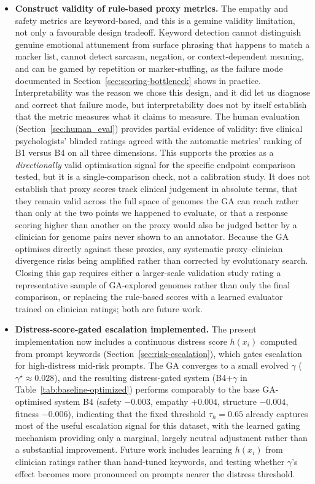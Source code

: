 \documentclass[mathematics,article,xetex,moreauthors]{Definitions/mdpi}
\begin{document}
\begin{itemize}
  \item \textbf{Construct validity of rule-based proxy metrics.} The
empathy and safety metrics are keyword-based, and this is a genuine
validity limitation, not only a favourable design tradeoff. Keyword
detection cannot distinguish genuine emotional attunement from surface
phrasing that happens to match a marker list, cannot detect sarcasm,
negation, or context-dependent meaning, and can be gamed by repetition
or marker-stuffing, as the failure mode documented in
Section~\ref{sec:scoring-bottleneck} shows in practice. Interpretability
was the reason we chose this design, and it did let us diagnose and
correct that failure mode, but interpretability does not by itself
establish that the metric measures what it claims to measure. The
human evaluation (Section~\ref{sec:human_eval}) provides partial
evidence of validity: five clinical psychologists' blinded ratings
agreed with the automatic metrics' ranking of B1 versus B4 on all three
dimensions. This supports the proxies as a \emph{directionally} valid
optimisation signal for the specific endpoint comparison tested, but it
is a single-comparison check, not a calibration study. It does not
establish that proxy scores track clinical judgement in absolute terms,
that they remain valid across the full space of genomes the GA can
reach rather than only at the two points we happened to evaluate, or
that a response scoring higher than another on the proxy would also be
judged better by a clinician for genome pairs never shown to an
annotator. Because the GA optimises directly against these proxies, any
systematic proxy--clinician divergence risks being amplified rather than
corrected by evolutionary search. Closing this gap requires either a
larger-scale validation study rating a representative sample of
GA-explored genomes rather than only the final comparison, or replacing
the rule-based scores with a learned evaluator trained on clinician
ratings; both are future work.

  \item \textbf{Distress-score-gated escalation implemented.} The present 
  implementation now includes a continuous distress score $h(x_i)$ computed 
  from prompt keywords (Section~\ref{sec:risk-escalation}), which gates 
  escalation for high-distress mid-risk prompts. The GA converges to a small 
  evolved $\gamma$ ($\gamma^{\star} \approx 0.028$), and the resulting 
  distress-gated system (B4+$\gamma$ in Table~\ref{tab:baseline-optimized}) 
  performs comparably to the base GA-optimised system B4 (safety $-0.003$, 
  empathy $+0.004$, structure $-0.004$, fitness $-0.006$), indicating that 
  the fixed threshold $\tau_h=0.65$ already captures most of the useful 
  escalation signal for this dataset, with the learned gating mechanism 
  providing only a marginal, largely neutral adjustment rather than a 
  substantial improvement. Future work includes learning $h(x_i)$ from 
  clinician ratings rather than hand-tuned keywords, and testing whether 
  $\gamma$'s effect becomes more pronounced on prompts nearer the distress 
  threshold.


\end{itemize}
\end{document}
